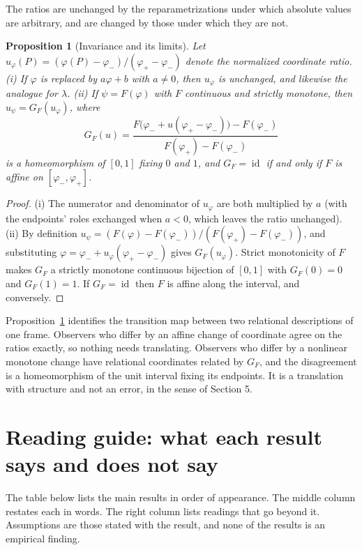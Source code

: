 \documentclass[11pt]{article}
\newtheorem{proposition}{Proposition}
\theoremstyle{remark}
\newcommand{\id}{\operatorname{id}}
\begin{document}
The ratios are unchanged by the reparametrizations under which absolute values are arbitrary, and are changed by those under which they are not.

\begin{proposition}[Invariance and its limits]\label{prop:inv}
Let $u_\varphi(P)=(\varphi(P)-\varphi_-)/(\varphi_+-\varphi_-)$ denote the normalized coordinate ratio. (i) If $\varphi$ is replaced by $a\varphi+b$ with $a\neq0$, then $u_\varphi$ is unchanged, and likewise the analogue for $\lambda$. (ii) If $\psi=F(\varphi)$ with $F$ continuous and strictly monotone, then $u_\psi=G_F(u_\varphi)$, where
\[
G_F(u)=\frac{F\bigl(\varphi_-+u(\varphi_+-\varphi_-)\bigr)-F(\varphi_-)}{F(\varphi_+)-F(\varphi_-)}
\]
is a homeomorphism of $[0,1]$ fixing $0$ and $1$, and $G_F=\id$ if and only if $F$ is affine on $[\varphi_-,\varphi_+]$.
\end{proposition}

\begin{proof}
(i) The numerator and denominator of $u_\varphi$ are both multiplied by $a$ (with the endpoints' roles exchanged when $a<0$, which leaves the ratio unchanged). (ii) By definition $u_\psi=(F(\varphi)-F(\varphi_-))/(F(\varphi_+)-F(\varphi_-))$, and substituting $\varphi=\varphi_-+u_\varphi(\varphi_+-\varphi_-)$ gives $G_F(u_\varphi)$. Strict monotonicity of $F$ makes $G_F$ a strictly monotone continuous bijection of $[0,1]$ with $G_F(0)=0$ and $G_F(1)=1$. If $G_F=\id$ then $F$ is affine along the interval, and conversely.
\end{proof}

Proposition~\ref{prop:inv} identifies the transition map between two relational descriptions of one frame. Observers who differ by an affine change of coordinate agree on the ratios exactly, so nothing needs translating. Observers who differ by a nonlinear monotone change have relational coordinates related by $G_F$, and the disagreement is a homeomorphism of the unit interval fixing its endpoints. It is a translation with structure and not an error, in the sense of Section 5.

\section{Reading guide: what each result says and does not say}\label{sec:guide}

The table below lists the main results in order of appearance. The middle column restates each in words. The right column lists readings that go beyond it. Assumptions are those stated with the result, and none of the results is an empirical finding.
\end{document}

